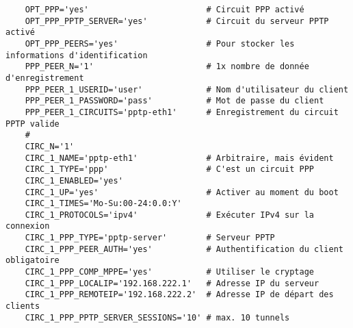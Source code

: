 \begin{example}
\begin{verbatim}
    OPT_PPP='yes'                        # Circuit PPP activé
    OPT_PPP_PPTP_SERVER='yes'            # Circuit du serveur PPTP activé
    OPT_PPP_PEERS='yes'                  # Pour stocker les informations d'identification
    PPP_PEER_N='1'                       # 1x nombre de donnée d'enregistrement
    PPP_PEER_1_USERID='user'             # Nom d'utilisateur du client
    PPP_PEER_1_PASSWORD='pass'           # Mot de passe du client
    PPP_PEER_1_CIRCUITS='pptp-eth1'      # Enregistrement du circuit PPTP valide
    #
    CIRC_N='1'
    CIRC_1_NAME='pptp-eth1'              # Arbitraire, mais évident
    CIRC_1_TYPE='ppp'                    # C'est un circuit PPP
    CIRC_1_ENABLED='yes'
    CIRC_1_UP='yes'                      # Activer au moment du boot
    CIRC_1_TIMES='Mo-Su:00-24:0.0:Y'
    CIRC_1_PROTOCOLS='ipv4'              # Exécuter IPv4 sur la connexion
    CIRC_1_PPP_TYPE='pptp-server'        # Serveur PPTP
    CIRC_1_PPP_PEER_AUTH='yes'           # Authentification du client obligatoire
    CIRC_1_PPP_COMP_MPPE='yes'           # Utiliser le cryptage
    CIRC_1_PPP_LOCALIP='192.168.222.1'   # Adresse IP du serveur
    CIRC_1_PPP_REMOTEIP='192.168.222.2'  # Adresse IP de départ des clients
    CIRC_1_PPP_PPTP_SERVER_SESSIONS='10' # max. 10 tunnels
\end{verbatim}
\end{example}
